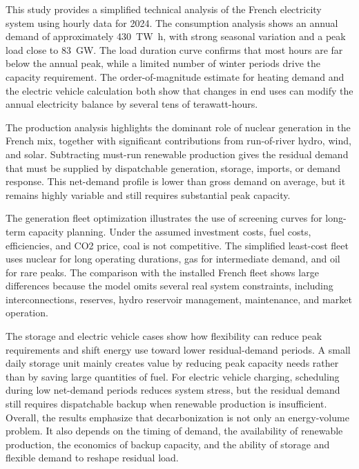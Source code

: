 \documentclass[a4paper]{report}
\begin{document}
This study provides a simplified technical analysis of the French electricity system using hourly data for 2024. The consumption analysis shows an annual demand of approximately \SI{430}{\tera\watt\hour}, with strong seasonal variation and a peak load close to \SI{83}{\giga\watt}. The load duration curve confirms that most hours are far below the annual peak, while a limited number of winter periods drive the capacity requirement. The order-of-magnitude estimate for heating demand and the electric vehicle calculation both show that changes in end uses can modify the annual electricity balance by several tens of terawatt-hours.

The production analysis highlights the dominant role of nuclear generation in the French mix, together with significant contributions from run-of-river hydro, wind, and solar. Subtracting must-run renewable production gives the residual demand that must be supplied by dispatchable generation, storage, imports, or demand response. This net-demand profile is lower than gross demand on average, but it remains highly variable and still requires substantial peak capacity.

The generation fleet optimization illustrates the use of screening curves for long-term capacity planning. Under the assumed investment costs, fuel costs, efficiencies, and CO2 price, coal is not competitive. The simplified least-cost fleet uses nuclear for long operating durations, gas for intermediate demand, and oil for rare peaks. The comparison with the installed French fleet shows large differences because the model omits several real system constraints, including interconnections, reserves, hydro reservoir management, maintenance, and market operation.

The storage and electric vehicle cases show how flexibility can reduce peak requirements and shift energy use toward lower residual-demand periods. A small daily storage unit mainly creates value by reducing peak capacity needs rather than by saving large quantities of fuel. For electric vehicle charging, scheduling during low net-demand periods reduces system stress, but the residual demand still requires dispatchable backup when renewable production is insufficient. Overall, the results emphasize that decarbonization is not only an energy-volume problem. It also depends on the timing of demand, the availability of renewable production, the economics of backup capacity, and the ability of storage and flexible demand to reshape residual load.

\vfill
{}
{}
\end{document}
